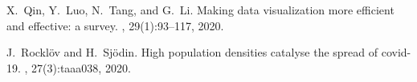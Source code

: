 \begin{thebibliography}{10}
X.~Qin, Y.~Luo, N.~Tang, and G.~Li.
\newblock Making data visualization more efficient and effective: a survey.
, 29(1):93--117, 2020.

J.~Rockl{\"o}v and H.~Sj{\"o}din.
\newblock High population densities catalyse the spread of covid-19.
, 27(3):taaa038, 2020.

\end{thebibliography}



